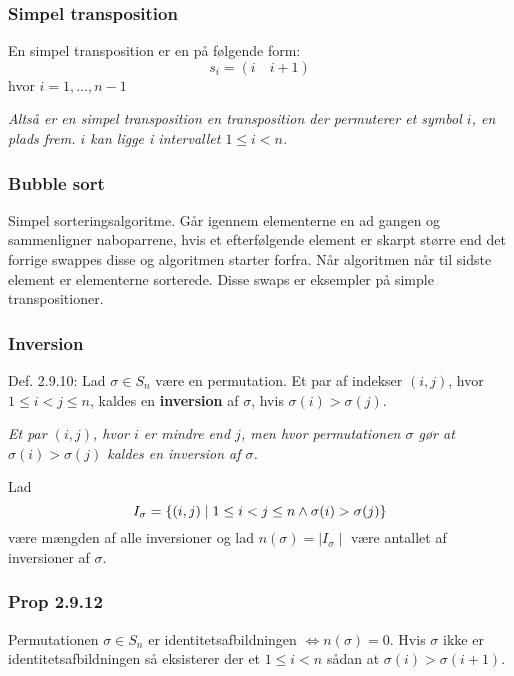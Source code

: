 \subsubsection{Simpel transposition}
\label{Simpel transposition}
En simpel transposition er en  på følgende form:
\begin{equation*}
  s_i = (i \quad i + 1)
\end{equation*}
hvor $i = 1,\ldots, n-1$

\textit{Altså er en simpel transposition en transposition der permuterer et
symbol $i$, en plads frem. $i$ kan ligge i intervallet $1 \leq i < n $.}

\subsubsection{Bubble sort}
Simpel sorteringsalgoritme. Går igennem elementerne en ad gangen og sammenligner
naboparrene, hvis et efterfølgende element er skarpt større end det forrige
swappes disse og algoritmen starter forfra. Når algoritmen når til sidste
element er elementerne sorterede. Disse swaps er eksempler på simple
transpositioner.

\subsubsection{Inversion}
\label{Inversion}
Def. 2.9.10: Lad $\sigma \in S_n$ være en permutation. Et par af indekser $(i,
j)$, hvor $1 \leq i < j \leq n$, kaldes en \textbf{inversion} af $\sigma$, hvis
$\sigma(i) > \sigma(j)$.

\textit{Et par $(i, j)$, hvor $i$ er mindre end $j$, men hvor permutationen
$\sigma$ gør at $\sigma(i) > \sigma(j)$ kaldes en inversion af $\sigma$.}

Lad
\begin{equation*}
  I_\sigma = \{ (i,j) \mid 1\leq i < j \leq n \wedge \sigma(i) > \sigma(j) \}
\end{equation*}
være mængden af alle inversioner og lad $n(\sigma) = \mid I_\sigma\mid$ være
antallet af inversioner af $\sigma$.

\subsubsection{Prop 2.9.12}
Permutationen $\sigma \in S_n$ er identitetsafbildningen $\iff n(\sigma) = 0$.
Hvis $\sigma$ ikke er identitetsafbildningen så eksisterer der et $1 \leq i < n$
sådan at $\sigma(i) > \sigma(i + 1)$.

